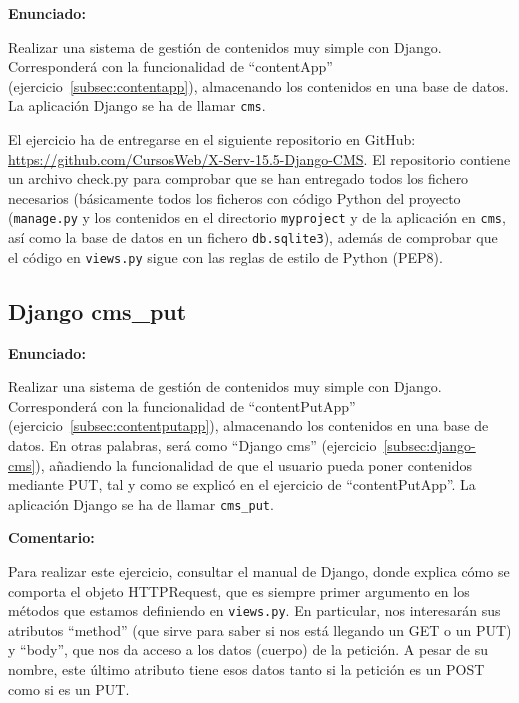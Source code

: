 \textbf{Enunciado:}

Realizar una sistema de gestión de contenidos muy simple con Django. Corresponderá con la funcionalidad de ``contentApp'' (ejercicio~\ref{subsec:contentapp}), almacenando los contenidos en una base de datos. La aplicación Django se ha de llamar \texttt{cms}.

El ejercicio ha de entregarse en el siguiente repositorio en GitHub: 
\url{https://github.com/CursosWeb/X-Serv-15.5-Django-CMS}. El repositorio contiene
un archivo check.py para comprobar que se han entregado todos los fichero necesarios (básicamente todos los ficheros con código Python del proyecto (\texttt{manage.py} y los contenidos en el directorio \texttt{myproject} y de la aplicación en \texttt{cms}, así como la base de datos en un fichero \texttt{db.sqlite3}), además de comprobar que el código en
\texttt{views.py} sigue con las reglas de estilo de Python (PEP8).

%


\subsection{Django cms\_put}
\label{subsec:django-cms-put}

\textbf{Enunciado:}

Realizar una sistema de gestión de contenidos muy simple con Django. Corresponderá con la funcionalidad de ``contentPutApp'' (ejercicio~\ref{subsec:contentputapp}), almacenando los contenidos en una base de datos. En otras palabras, será como ``Django cms'' (ejercicio~\ref{subsec:django-cms}), añadiendo la funcionalidad de que el usuario pueda poner contenidos mediante PUT, tal y como se explicó en el ejercicio de ``contentPutApp''. La aplicación Django se ha de llamar \texttt{cms\_put}.


\textbf{Comentario:}

Para realizar este ejercicio, consultar el manual de Django, donde explica cómo se comporta el objeto HTTPRequest, que es siempre primer argumento en los métodos que estamos definiendo en \texttt{views.py}. En particular, nos interesarán sus atributos ``method'' (que sirve para saber si nos está llegando un GET o un PUT) y ``body'', que nos da acceso a los datos (cuerpo) de la petición. A pesar de su nombre, este último atributo tiene esos datos tanto si la petición es un POST como si es un PUT. 


